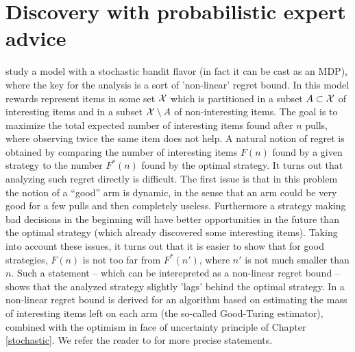 \section{Discovery with probabilistic expert advice}
\cite{BEG11} study a model with a stochastic bandit flavor (in fact it can be cast as an MDP), where the key for the analysis is a sort of 'non-linear' regret bound.
In this model rewards represent items in some set $\mathcal{X}$ which is partitioned in a subset  $A \subset \mathcal{X}$ of interesting items and in a subset $\mathcal{X}\setminus A$ of non-interesting items. The goal is to maximize the total expected number of interesting items found after $n$ pulls, where observing twice the same item does not help. A natural notion of regret is obtained by comparing the number of interesting items $F(n)$ found by a given strategy to the number $F^*(n)$ found by the optimal strategy. It turns out that analyzing such regret directly is difficult. The first issue is that in this problem the notion of a ``good'' arm is dynamic, in the sense that an arm could be very good for a few pulls and then completely useless. Furthermore a strategy making bad decisions in the beginning will have better opportunities in the future than the optimal strategy (which already discovered some interesting items). Taking into account these issues, it turns out that it is easier to show that for good strategies, $F(n)$ is not too far from $F^*(n')$, where $n'$ is not much smaller than $n$. Such a statement -- which can be interepreted as a non-linear regret bound -- shows that the analyzed strategy slightly 'lags' behind the optimal strategy. In \cite{BEG11} a non-linear regret bound is derived for an algorithm based on estimating the mass of interesting items left on each arm (the so-called Good-Turing estimator), combined with the optimism in face of uncertainty principle of Chapter \ref{stochastic}. We refer the reader to \cite{BEG11} for more precise statements.

